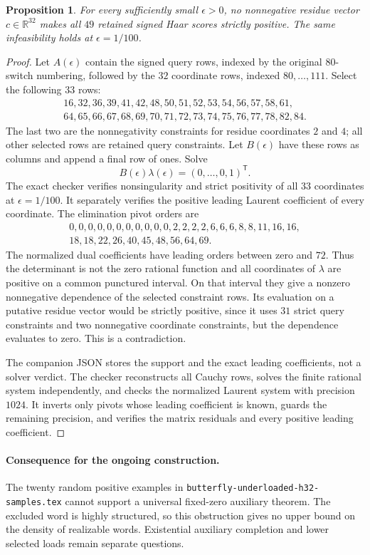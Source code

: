 \documentclass[11pt]{article}
\newtheorem{proposition}{Proposition}
\begin{document}
\begin{proposition}
For every sufficiently small $\epsilon>0$, no nonnegative residue vector
$c\in\mathbb R^{32}$ makes all $49$ retained signed Haar scores strictly
positive. The same infeasibility holds at $\epsilon=1/100$.
\end{proposition}
\begin{proof}
Let $A(\epsilon)$ contain the signed query rows, indexed by the original
$80$-switch numbering, followed by the $32$ coordinate rows, indexed
$80,\ldots,111$. Select the following $33$ rows:
\[
\begin{gathered}
16,32,36,39,41,42,48,50,51,52,53,54,56,57,58,61,\\
64,65,66,67,68,69,70,71,72,73,74,75,76,77,78,82,84.
\end{gathered}
\]
The last two are the nonnegativity constraints for residue coordinates
$2$ and $4$; all other selected rows are retained query constraints.
Let $B(\epsilon)$ have these rows as columns and append a final row of
ones. Solve
\[
 B(\epsilon)\lambda(\epsilon)=(0,\ldots,0,1)^{\mathsf T}.
\]
The exact checker verifies nonsingularity and strict positivity of all
$33$ coordinates at $\epsilon=1/100$. It separately verifies the positive
leading Laurent coefficient of every coordinate. The elimination pivot
orders are
\[
\begin{gathered}
0,0,0,0,0,0,0,0,0,0,0,2,2,2,2,6,6,6,8,8,11,16,16,\\
18,18,22,26,40,45,48,56,64,69.
\end{gathered}
\]
The normalized dual coefficients have leading orders between zero and
$72$. Thus the determinant is not the zero rational function and all
coordinates of $\lambda$ are positive on a common punctured interval.
On that interval they give a nonzero nonnegative dependence of the
selected constraint rows. Its evaluation on a putative residue vector
would be strictly positive, since it uses $31$ strict query constraints
and two nonnegative coordinate constraints, but the dependence evaluates
to zero. This is a contradiction.

The companion JSON stores the support and the exact leading coefficients,
not a solver verdict. The checker reconstructs all Cauchy rows, solves
the finite rational system independently, and checks the normalized
Laurent system with precision $1024$. It inverts only pivots whose leading
coefficient is known, guards the remaining precision, and verifies the
matrix residuals and every positive leading coefficient.
\end{proof}

\paragraph{Consequence for the ongoing construction.}
The twenty random positive examples in
\texttt{butterfly-underloaded-h32-samples.tex} cannot support a universal
fixed-zero auxiliary theorem. The excluded word is highly structured,
so this obstruction gives no upper bound on the density of realizable
words. Existential auxiliary completion and lower selected loads remain
separate questions.
\end{document}
